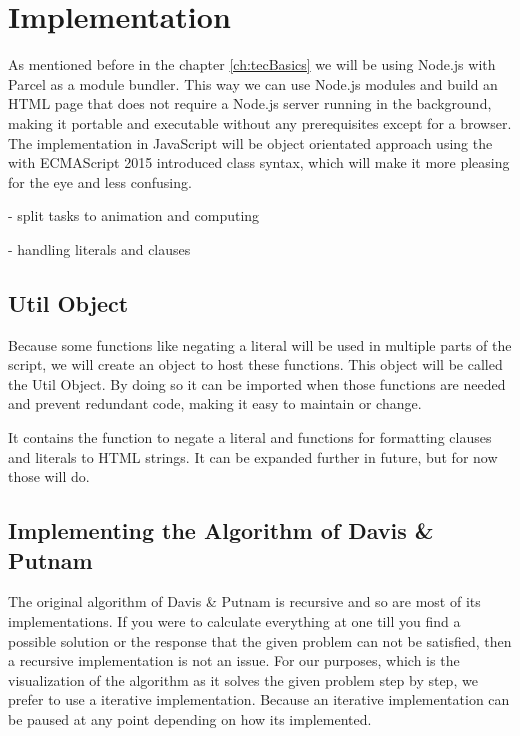 
\chapter{Implementation}
\label{ch:implementation}
As mentioned before in the chapter \ref{ch:tecBasics} we will be using Node.js with Parcel as a module bundler. This way we can use Node.js modules and build an HTML page that does not require a Node.js server running in the background, making it portable and executable without any prerequisites except for a browser. The implementation in JavaScript will be object orientated approach using the with ECMAScript 2015 introduced class syntax, which will make it more pleasing for the eye and less confusing.

- split tasks to animation and computing

- handling literals and clauses

\section{Util Object}
\label{sec:impUtil}
Because some functions like negating a literal will be used in multiple parts of the script, we will create an object to host these functions. This object will be called the Util Object. By doing so it can be imported when those functions are needed and prevent redundant code, making it easy to maintain or change.

It contains the function to negate a literal and functions for formatting clauses and literals to HTML strings. It can be expanded further in future, but for now those will do.

\section{Implementing the Algorithm of Davis \& Putnam}
\label{sec:impDavisPutnam}
The original algorithm of Davis \& Putnam is recursive and so are most of its implementations. If you were to calculate everything at one till you find a possible solution or the response that the given problem can not be satisfied, then a recursive implementation is not an issue. For our purposes, which is the visualization of the algorithm as it solves the given problem step by step, we prefer to use a iterative implementation. Because an iterative implementation can be paused at any point depending on how its implemented.

